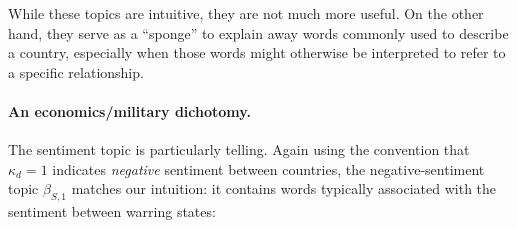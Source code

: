 While these topics are intuitive, they are not much more useful.  On
the other hand, they serve as a ``sponge'' to explain away words commonly used to describe a country, especially when those words might otherwise be interpreted to refer to a specific relationship.

\paragraph{An economics/military dichotomy.}
The sentiment topic is particularly telling.  Again using the
convention that $\kappa_d=1$ indicates \emph{negative} sentiment
between countries, the negative-sentiment topic $\beta_{S,1}$ matches
our intuition: it contains words typically associated with the
sentiment between warring states:


